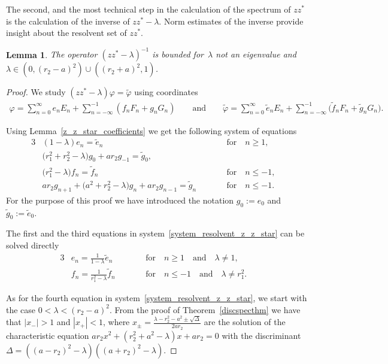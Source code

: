 \documentclass[pdftex]{sigma}
\numberwithin{equation}{section}
\newtheorem{Lemma}[Theorem]{Lemma}
\begin{document}
The second, and the most technical step in the calculation of the spectrum of $zz^*$ is the calculation of the inverse
of $zz^*-\lambda$.
Norm estimates of the inverse provide insight about the resolvent set of $zz^*$.

\begin{Lemma}
\label{resolvent_z_z_star}
The operator $(zz^*-\lambda)^{-1}$ is bounded for~$\lambda$ not an eigenvalue and
$\lambda\in(0,(r_2-a)^2)\cup((r_2+a)^2,1)$.
\end{Lemma}

\begin{proof}
We study $(zz^*-\lambda)\varphi=\tilde{\varphi}$ using coordinates
\begin{gather*}
\varphi=\sum\limits_{n=0}^\infty e_nE_n+\sum\limits_{n=-\infty}^{-1}(f_nF_n+g_nG_n)
\qquad
\text{and}
\qquad
\tilde{\varphi}=\sum\limits_{n=0}^\infty \tilde{e}_nE_n+\sum\limits_{n=-\infty}^{-1}\big(\tilde{f}_nF_n+\tilde{g}_nG_n\big).
\end{gather*}

Using Lemma~\ref{z_z_star_coefficients} we get the following system of equations
\begin{alignat}{3}
&  (1-\lambda)e_n=\tilde{e}_n && \text{for}\quad n\ge1,&\nonumber
\\
&\big(r_1^2+ r_2^2-\lambda\big)g_0+ar_2g_{-1}=\tilde{g}_0,&&&\nonumber
\\
&\big(r_1^2-\lambda\big)f_n=\tilde{f}_n && \text{for}\quad n\le-1,&\nonumber
\\
& ar_2g_{n+1}+\big(a^2+r_2^2-\lambda\big)g_n+ar_2g_{n-1}=\tilde{g}_n \qquad & &\text{for}\quad n\le-1.& \label{system_resolvent_z_z_star}
\end{alignat}
For the purpose of this proof we have introduced the notation $g_0:=e_0$ and $\tilde{g}_0:=\tilde{e}_0$.

The f\/irst and the third equations in system~\eqref{system_resolvent_z_z_star} can be solved directly
\begin{alignat*}{3}%
& e_n=\frac{1}{1-\lambda}\tilde{e}_n \qquad && \text{for}\quad n\ge1
\quad
\text{and}
\quad
\lambda\neq 1, &
\\
& f_n=\frac{1}{r_1^2-\lambda}\tilde{f}_n \qquad && \text{for}\quad n\le-1
\quad
\text{and}
\quad
\lambda\neq r_1^2. &
\end{alignat*}

As for the fourth equation in system~\eqref{system_resolvent_z_z_star}, we start with the case $0<\lambda<(r_2-a)^2$.
From the proof of Theorem~\ref{discspecthm} we have that $|x_-|>1$ and $|x_+|<1$,
where $x_{\pm}=\frac{\lambda-r_2^2- a^2 \pm \sqrt{\Delta}}{2ar_2}$
are the solution of the characteristic equation $ar_2x^2+(r_2^2+a^2-\lambda)x+ar_2= 0$
with the discriminant $\Delta=((a-r_2)^2-\lambda)((a+r_2)^2-\lambda)$.


\end{proof}
\end{document}
